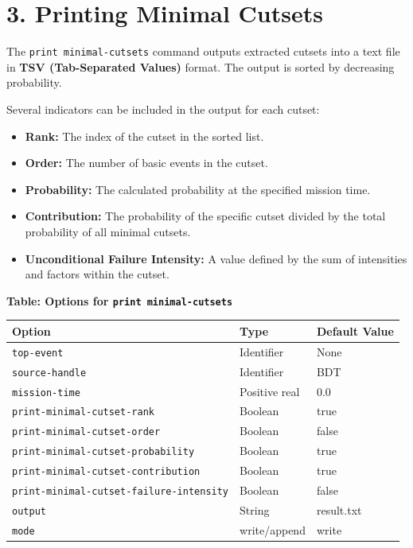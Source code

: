 \section*{3. Printing Minimal Cutsets}
The \texttt{print minimal-cutsets} command outputs extracted cutsets into a text file in \textbf{TSV (Tab-Separated Values)} format. The output is sorted by decreasing probability.

Several indicators can be included in the output for each cutset:
\begin{itemize}
    \item \textbf{Rank:} The index of the cutset in the sorted list.
    \item \textbf{Order:} The number of basic events in the cutset.
    \item \textbf{Probability:} The calculated probability at the specified mission time.
    \item \textbf{Contribution:} The probability of the specific cutset divided by the total probability of all minimal cutsets.
    \item \textbf{Unconditional Failure Intensity:} A value defined by the sum of intensities and factors within the cutset.
\end{itemize}

\textbf{Table: Options for \texttt{print minimal-cutsets}}

\begin{center}
\begin{tabular}{lll}
\hline
\textbf{Option} & \textbf{Type} & \textbf{Default Value} \\ \hline
\texttt{top-event} & Identifier & None \\
\texttt{source-handle} & Identifier & BDT \\
\texttt{mission-time} & Positive real & 0.0 \\
\texttt{print-minimal-cutset-rank} & Boolean & true \\
\texttt{print-minimal-cutset-order} & Boolean & false \\
\texttt{print-minimal-cutset-probability} & Boolean & true \\
\texttt{print-minimal-cutset-contribution} & Boolean & true \\
\texttt{print-minimal-cutset-failure-intensity} & Boolean & false \\
\texttt{output} & String & result.txt \\
\texttt{mode} & write/append & write \\ \hline
\end{tabular}
\end{center}

